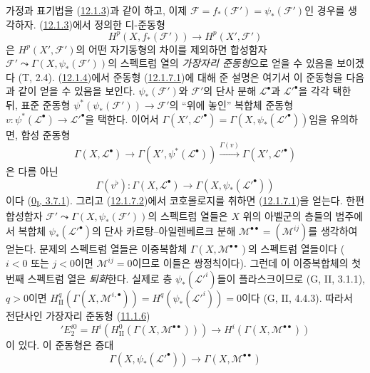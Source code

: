 \begin{env}[12.1.7]
\label{0.12.1.7-fr}
가정과 표기법을 (\hyperref[0.12.1.3-fr]{12.1.3})과 같이 하고,
이제 $\mathcal F=f_*(\mathcal F')=\psi_*(\mathcal F')$인 경우를 생각하자.
(\hyperref[0.12.1.3-fr]{12.1.3})에서 정의한 디-준동형
\[
\label{0.12.1.7.1-fr}
\tag{12.1.7.1}
H^p(X,f_*(\mathcal F'))\longrightarrow H^p(X',\mathcal F')
\]
은 $H^p(X',\mathcal F')$의 어떤 자기동형의 차이를 제외하면 합성함자
$\mathcal F'\leadsto\Gamma(X,\psi_*(\mathcal F'))$의 스펙트럼 열의
\emph{가장자리 준동형}으로 얻을 수 있음을 보이겠다 (T, 2.4).
(\hyperref[0.12.1.4-fr]{12.1.4})에서 준동형
(\hyperref[0.12.1.7.1-fr]{12.1.7.1})에 대해 준 설명은 여기서 이 준동형을
다음과 같이 얻을 수 있음을 보인다. $\psi_*(\mathcal F')$와
$\mathcal F'$의 단사 분해 $\mathcal L^\bullet$과
$\mathcal L'^\bullet$을 각각 택한 뒤, 표준 준동형
$\psi^*(\psi_*(\mathcal F'))\to\mathcal F'$의 ``위에 놓인'' 복합체 준동형
$v:\psi^*(\mathcal L^\bullet)\to\mathcal L'^\bullet$을 택한다.
이어서 $\Gamma(X',\mathcal L'^\bullet)=
\Gamma(X,\psi_*(\mathcal L'^\bullet))$임을 유의하면, 합성 준동형
\[
\Gamma(X,\mathcal L^\bullet)\longrightarrow
\Gamma(X',\psi^*(\mathcal L^\bullet))
\xrightarrow{\Gamma(v)}\Gamma(X',\mathcal L'^\bullet)
\]
은 다름 아닌
\[
\label{0.12.1.7.2-fr}
\tag{12.1.7.2}
\Gamma(v^\flat):\Gamma(X,\mathcal L^\bullet)
\longrightarrow\Gamma(X,\psi_*(\mathcal L'^\bullet))
\]
이다 (\hyperref[0.3.7.1-ko]{0\textsubscript{I}, 3.7.1}). 그리고
(\hyperref[0.12.1.7.2-fr]{12.1.7.2})에서 코호몰로지를 취하면
(\hyperref[0.12.1.7.1-fr]{12.1.7.1})을 얻는다. 한편 합성함자
$\mathcal F'\leadsto\Gamma(X,\psi_*(\mathcal F'))$의 스펙트럼 열들은
$X$ 위의 아벨군의 층들의 범주에서 복합체
$\psi_*(\mathcal L'^\bullet)$의 단사 카르탕--아일렌베르크 분해
$\mathcal M^{\bullet\bullet}=(\mathcal M^{ij})$를 생각하여 얻는다.
문제의 스펙트럼 열들은 이중복합체
$\Gamma(X,\mathcal M^{\bullet\bullet})$의 스펙트럼 열들이다
($i<0$ 또는 $j<0$이면 $\mathcal M^{ij}=0$이므로 이들은 쌍정칙이다).
그런데 이 이중복합체의 첫 번째 스펙트럼 열은 \emph{퇴화}한다.
실제로 층 $\psi_*(\mathcal L'^i)$들이 플라스크이므로 (G, II, 3.1.1),
$q>0$이면
$H_{\mathrm{II}}^q(\Gamma(X,\mathcal M^{i,\bullet}))
=H^q(\psi_*(\mathcal L'^i))=0$이다 (G, II, 4.4.3). 따라서 전단사인
가장자리 준동형 (\hyperref[0.11.1.6-fr]{11.1.6})
\[
\label{0.12.1.7.3-fr}
\tag{12.1.7.3}
'E_2^{i0}=H^i(H_{\mathrm{II}}^0(\Gamma(X,\mathcal M^{\bullet\bullet})))
\longrightarrow H^i(\Gamma(X,\mathcal M^{\bullet\bullet}))
\]
이 있다. 이 준동형은 증대
\[
\label{0.12.1.7.4-fr}
\tag{12.1.7.4}
\Gamma(X,\psi_*(\mathcal L'^\bullet))
\longrightarrow\Gamma(X,\mathcal M^{\bullet\bullet})
\]
\end{env}
